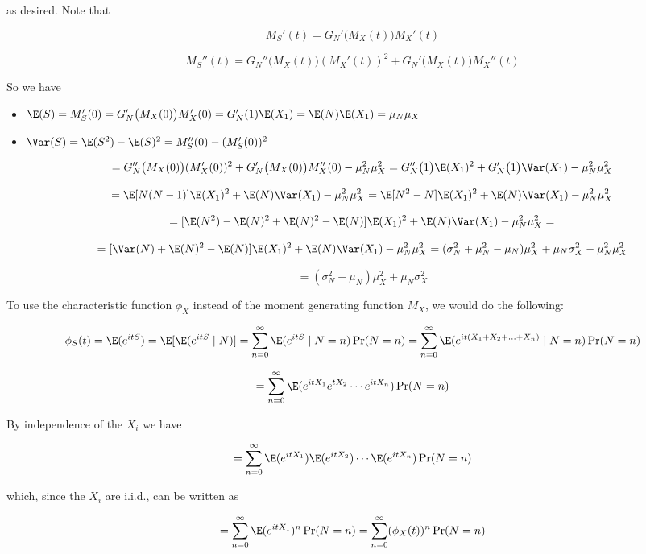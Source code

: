 as desired. Note that

\[
M_S'(t) = G_N' \big( M_X(t) \big) M_X'(t)
\]

\[
M_S''(t) = G_N'' \big( M_X(t) \big) (M_X'(t))^2 + G_N' \big( M_X(t) \big) M_X''(t)
\]

So we have

\begin{itemize}

\item \(\E(S) = M_S'(0) =G_N' \big( M_X(0) \big) M_X'(0) = G_N'(1) \E(X_1) = \E(N) \E(X_1) = \mu_N \mu_X\)

\item \(\Var(S) =  \E(S^2) - \E(S)^2 = M_S''(0) - (M_S'(0))^2  \)

\[
= G_N'' \big( M_X(0) \big) (M_X'(0))^2 + G_N' \big( M_X(0) \big) M_X''(0) - \mu_N^2 \mu_X^2  = G_N'' \big( 1 \big) \E(X_1)^2 + G_N' \big( 1 \big) \Var(X_1) - \mu_N^2 \mu_X^2
\]

\[
= \E[N(N-1)] \E(X_1)^2 + \E(N) \Var(X_1) - \mu_N^2 \mu_X^2 = \E[N^2-N] \E(X_1)^2 + \E(N) \Var(X_1) - \mu_N^2 \mu_X^2
\]

\[
= [\E(N^2) - \E(N)^2 + \E(N)^2 - \E(N)] \E(X_1)^2 + \E(N) \Var(X_1) - \mu_N^2 \mu_X^2 = 
\]

\[
= [\Var(N) + \E(N)^2 - \E(N)] \E(X_1)^2 + \E(N) \Var(X_1) - \mu_N^2 \mu_X^2 = (\sigma_N^2 + \mu_N^2 -\mu_N)\mu_X^2 + \mu_N \sigma_X^2 - \mu_N^2 \mu_X^2
\]

\[
= \boxed{ (\sigma_N^2  -\mu_N)\mu_X^2 + \mu_N \sigma_X^2}
\]

\end{itemize}

To use the characteristic function \(\phi_X\) instead of the moment generating function \(M_X\), we would do the following:

\[
\phi_S(t) = \E(e^{itS}) = \E[ \E(e^{itS} \mid N)] =\sum_{n=0}^\infty \E(e^{itS} \mid N = n) \Pr(N = n) =\sum_{n=0}^\infty \E(e^{it(X_1 + X_2 + \ldots + X_n)} \mid N = n) \Pr(N = n)
\]

\[
=\sum_{n=0}^\infty \E(e^{itX_1} e^{tX_2}\cdots e^{it X_n} ) \Pr(N = n)
\]

By independence of the \(X_i\) we have

\[
=\sum_{n=0}^\infty \E(e^{itX_1}) \E( e^{itX_2})\cdots \E( e^{it X_n}) \Pr(N = n)
\]

which, since the \(X_i\) are i.i.d., can be written as

\[
=\sum_{n=0}^\infty \E(e^{itX_1})^n \Pr(N = n) =\sum_{n=0}^\infty (\phi_X(t))^n \Pr(N = n)
\]

